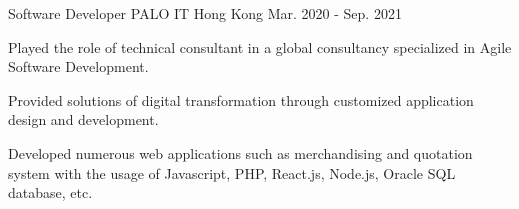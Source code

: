 

\begin{cventries}

  \cventry
    {Software Developer} %
    {PALO IT} %
    {Hong Kong} %
    {Mar. 2020 - Sep. 2021} %
    {
      \begin{cvitems} %
        \item {Played the role of technical consultant in a global consultancy specialized in Agile Software Development.}
        \item {Provided solutions of digital transformation through customized application design and development.}
        \item {Developed numerous web applications such as merchandising and quotation system with the usage of Javascript, PHP, React.js, Node.js, Oracle SQL database, etc.}
      \end{cvitems}
    }

\end{cventries}
